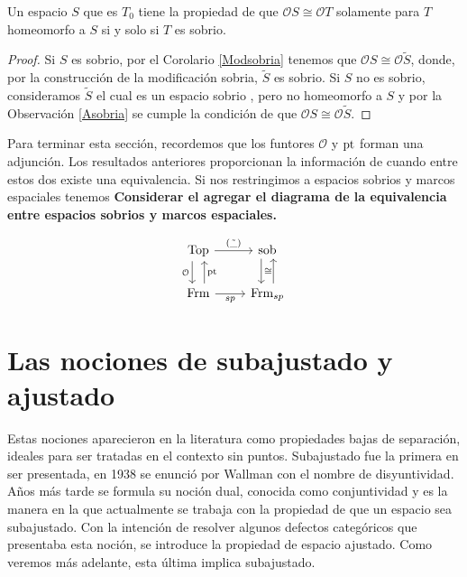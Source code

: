 \documentclass{comunicaciones}
\begin{document}
\begin{prop}
    Un espacio $S$ que es $T_0$ tiene la propiedad de que $\mathcal{O}S\cong \mathcal{O}T$ solamente para $T$ homeomorfo a $S$ si y solo si $T$ es sobrio.
\end{prop}

\begin{proof}
    Si $S$ es sobrio, por el Corolario \ref{Modsobria} tenemos que $\mathcal{O}S\cong \mathcal{O}\tilde{S}$, donde, por la construcción de la modificación sobria, $\tilde{S}$ es sobrio. Si $S$ no es sobrio, consideramos $\tilde{S}$ el cual es un espacio sobrio , pero no homeomorfo a $S$ y por la Observación \ref{Asobria} se cumple la condición de que $\mathcal{O}S\cong \mathcal{O}\tilde{S}$.
\end{proof}

Para terminar esta sección, recordemos que los funtores $\mathcal{O}$ y $\mathrm{pt}$ forman una adjunción. Los resultados anteriores proporcionan la información de cuando entre estos dos existe una equivalencia. Si nos restringimos a espacios sobrios y marcos espaciales tenemos 
\textbf{Considerar el agregar el diagrama de la equivalencia entre espacios sobrios y marcos espaciales.}



\[\begin{tikzcd}
	\Top & \sob \\
	\Frm & {\Frm_{sp}}
	\arrow["{\mathcal{O}}"', shift right=2, from=1-1, to=2-1]
	\arrow["\pt"', shift right=2, from=2-1, to=1-1]
	\arrow["{(\tilde{\_})}", from=1-1, to=1-2]
	\arrow["sp"', from=2-1, to=2-2]
	\arrow["\cong", shift right=2, from=1-2, to=2-2]
	\arrow[shift right=2, from=2-2, to=1-2]
\end{tikzcd}\]


\section{Las nociones de subajustado y ajustado}

Estas nociones aparecieron en la literatura como propiedades bajas de separación, ideales para ser tratadas en el contexto sin puntos. Subajustado fue la primera en ser presentada, en 1938 se enunció por Wallman con el nombre de disyuntividad. Años más tarde se formula su noción dual, conocida como conjuntividad y es la manera en la que actualmente se trabaja con la propiedad de que un espacio sea subajustado. Con la intención de resolver algunos defectos categóricos que presentaba esta noción, se introduce la propiedad de espacio ajustado. Como veremos más adelante, esta última implica subajustado.\\
\end{document}
